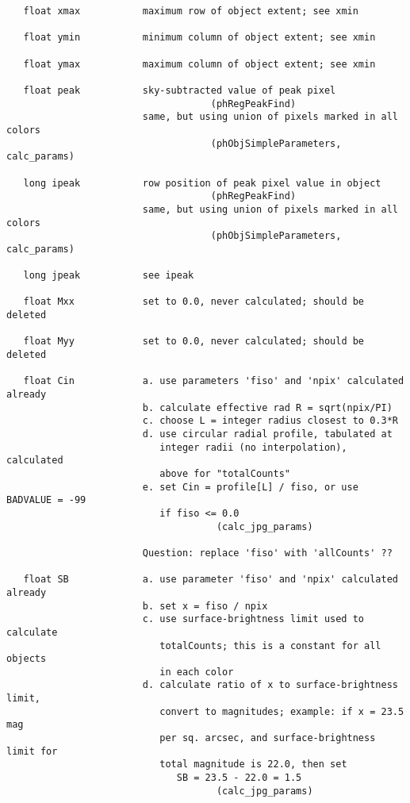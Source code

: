 \begin{verbatim}
   float xmax           maximum row of object extent; see xmin

   float ymin           minimum column of object extent; see xmin

   float ymax           maximum column of object extent; see xmin

   float peak           sky-subtracted value of peak pixel
                                    (phRegPeakFind)
                        same, but using union of pixels marked in all colors
                                    (phObjSimpleParameters, calc_params)
   
   long ipeak           row position of peak pixel value in object
                                    (phRegPeakFind)
                        same, but using union of pixels marked in all colors
                                    (phObjSimpleParameters, calc_params)
                              
   long jpeak           see ipeak
                          
   float Mxx            set to 0.0, never calculated; should be deleted

   float Myy            set to 0.0, never calculated; should be deleted

   float Cin            a. use parameters 'fiso' and 'npix' calculated already
                        b. calculate effective rad R = sqrt(npix/PI)
                        c. choose L = integer radius closest to 0.3*R
                        d. use circular radial profile, tabulated at
                           integer radii (no interpolation), calculated
                           above for "totalCounts"
                        e. set Cin = profile[L] / fiso, or use BADVALUE = -99
                           if fiso <= 0.0
                                     (calc_jpg_params)
 
                        Question: replace 'fiso' with 'allCounts' ??
   
   float SB             a. use parameter 'fiso' and 'npix' calculated already
                        b. set x = fiso / npix
                        c. use surface-brightness limit used to calculate
                           totalCounts; this is a constant for all objects
                           in each color
                        d. calculate ratio of x to surface-brightness limit,
                           convert to magnitudes; example: if x = 23.5 mag
                           per sq. arcsec, and surface-brightness limit for
                           total magnitude is 22.0, then set 
                              SB = 23.5 - 22.0 = 1.5
                                     (calc_jpg_params)


\end{verbatim}
